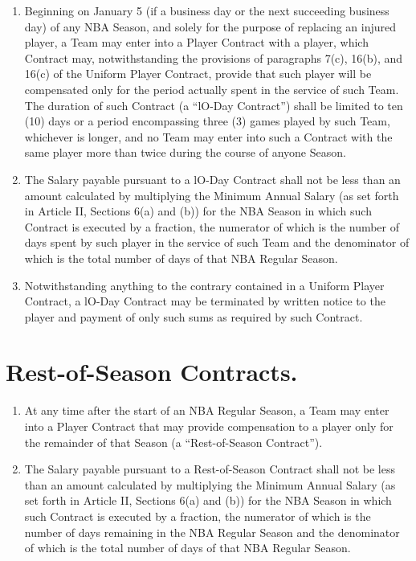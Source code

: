 \documentclass[
]{book}
\providecommand{\tightlist}{%
  \setlength{\itemsep}{0pt}\setlength{\parskip}{0pt}}
\begin{document}
\begin{enumerate}
\def\labelenumi{(\alph{enumi})}
\tightlist
\item
  Beginning on January 5 (if a business day or the next succeeding business day) of any NBA Season, and solely for the purpose of replacing an injured player, a Team may enter into a Player Contract with a player, which Contract may, notwithstanding the provisions of paragraphs 7(c), 16(b), and 16(c) of the Uniform Player Contract, provide that such player will be compensated only for the period actually spent in the service of such Team. The duration of such Contract (a ``lO-Day Contract'') shall be limited to ten (10) days or a period encompassing three (3) games played by such Team, whichever is longer, and no Team may enter into such a Contract with the same player more than twice during the course of anyone Season.
\item
  The Salary payable pursuant to a lO-Day Contract shall not be less than an amount calculated by multiplying the Minimum Annual Salary (as set forth in Article II, Sections 6(a) and (b)) for the NBA Season in which such Contract is executed by a fraction, the numerator of which is the number of days spent by such player in the service of such Team and the denominator of which is the total number of days of that NBA Regular Season.
\item
  Notwithstanding anything to the contrary contained in a Uniform Player Contract, a lO-Day Contract may be terminated by written notice to the player and payment of only such sums as required by such Contract.
\end{enumerate}

\hypertarget{rest-of-season-contracts.}{%
\section{Rest-of-Season Contracts.}\label{rest-of-season-contracts.}}

\begin{enumerate}
\def\labelenumi{(\alph{enumi})}
\tightlist
\item
  At any time after the start of an NBA Regular Season, a Team may enter into a Player Contract that may provide compensation to a player only for the remainder of that Season (a ``Rest-of-Season Contract'').
\item
  The Salary payable pursuant to a Rest-of-Season Contract shall not be less than an amount calculated by multiplying the Minimum Annual Salary (as set forth in Article II, Sections 6(a) and (b)) for the NBA Season in which such Contract is executed by a fraction, the numerator of which is the number of days remaining in the NBA Regular Season and the denominator of which is the total number of days of that NBA Regular Season.
\end{enumerate}
\end{document}
